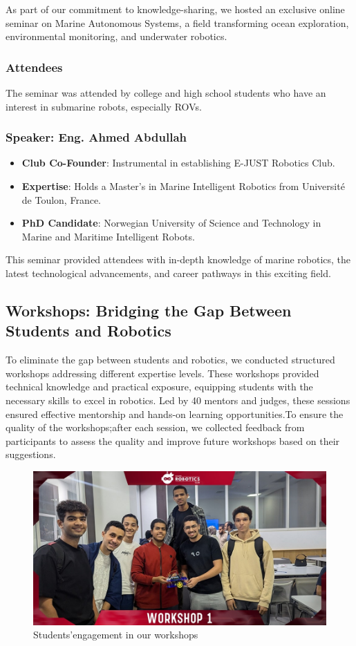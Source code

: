 \documentclass[11pt, twocolumn]{article}
\begin{document}
\noindent As part of our commitment to knowledge-sharing, we hosted an exclusive online seminar on Marine Autonomous Systems, a field transforming ocean exploration, environmental monitoring, and underwater robotics.
\subsubsection{Attendees}
The seminar was attended by college and high school students who have an interest in submarine robots, especially ROVs.

\subsubsection{Speaker: Eng. Ahmed Abdullah}
\begin{itemize}
    \item \textbf{Club Co-Founder}: Instrumental in establishing E-JUST Robotics Club.
    \item \textbf{Expertise}: Holds a Master’s in Marine Intelligent Robotics from Université de Toulon, France.
    \item \textbf{PhD Candidate}: Norwegian University of Science and Technology in Marine and Maritime Intelligent Robots.

    


\end{itemize}

This seminar provided attendees with in-depth knowledge of marine robotics, the latest technological advancements, and career pathways in this exciting field.

\subsection{Workshops: Bridging the Gap Between Students and Robotics}
To eliminate the gap between students and robotics, we conducted structured workshops addressing different expertise levels. These workshops provided technical knowledge and practical exposure, equipping students with the necessary skills to excel in robotics. Led by 40 mentors and judges, these sessions ensured effective mentorship and hands-on learning opportunities.To ensure the quality of the workshops;after each session, we collected feedback from participants to assess the quality and improve future workshops based on their suggestions.
\begin{figure}[h]
            \centering
            \includegraphics[width=0.49\linewidth]{Images/workshop oo.jpg}
           \caption{Students'engagement in our workshops}
            \label{fig:enter-label}
                \end{figure}
\end{document}

